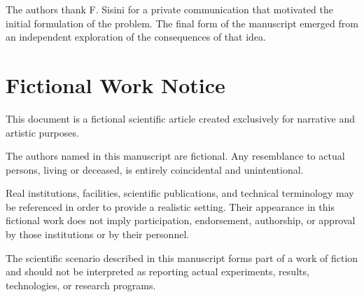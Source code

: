 \documentclass[
  aps,
  prc,
  reprint,
  superscriptaddress,
  nofootinbib
]{revtex4-2}
\begin{document}
\maketitle









\begin{acknowledgments}
The authors thank F. Sisini for a private communication that
motivated the initial formulation of the problem. The final form
of the manuscript emerged from an independent exploration of the
consequences of that idea.
\end{acknowledgments}



\section*{Fictional Work Notice}

This document is a fictional scientific article created exclusively
for narrative and artistic purposes.

The authors named in this manuscript are fictional. Any resemblance
to actual persons, living or deceased, is entirely coincidental and
unintentional.

Real institutions, facilities, scientific publications, and technical
terminology may be referenced in order to provide a realistic setting.
Their appearance in this fictional work does not imply participation,
endorsement, authorship, or approval by those institutions or by their
personnel.

The scientific scenario described in this manuscript forms part of a
work of fiction and should not be interpreted as reporting actual
experiments, results, technologies, or research programs.
\end{document}
